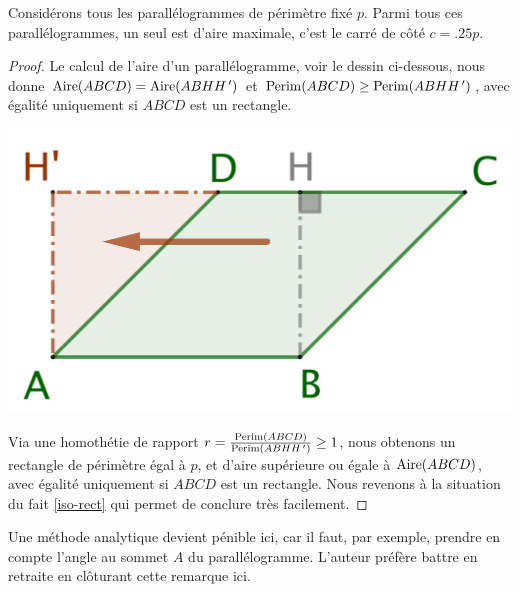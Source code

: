 \begin{fact} \label{iso-para}
	Considérons tous les parallélogrammes de périmètre fixé $p$. Parmi tous ces parallélogrammes, un seul est d'aire maximale, c'est le carré de côté $c = \num{.25} p$.
\end{fact}


\begin{proof}
	Le calcul de l'aire d'un parallélogramme, voir le dessin ci-dessous, nous donne 
	$\mathrm{Aire}(ABCD) = \mathrm{Aire}(ABHH^{\,\prime})$ et 
	$\mathrm{Perim}(ABCD) \geq \mathrm{Perim}(ABHH^{\,\prime})$, 
	avec égalité uniquement si $ABCD$ est un rectangle. 
	
	\begin{center}
		\includegraphics[scale=.4]{content/quadrilateral/parallelogram/para-2-rect.png}
	\end{center}
	
	Via une homothétie de rapport $r = \frac{\mathrm{Perim}(ABCD)}{\mathrm{Perim}(ABHH^{\,\prime})} \geq 1$, nous obtenons un rectangle 
	de périmètre égal à $p$,
	et d'aire supérieure ou égale à $\mathrm{Aire}(ABCD)$, 
	avec égalité uniquement si $ABCD$ est un rectangle.
	Nous revenons à la situation du fait \ref{iso-rect} qui permet de conclure très facilement.
\end{proof}




\begin{remark}
	Une méthode analytique devient pénible ici, car il faut, par exemple, prendre en compte l'angle au sommet $A$ du parallélogramme. L'auteur préfère battre en retraite en clôturant cette remarque ici.
\end{remark}
